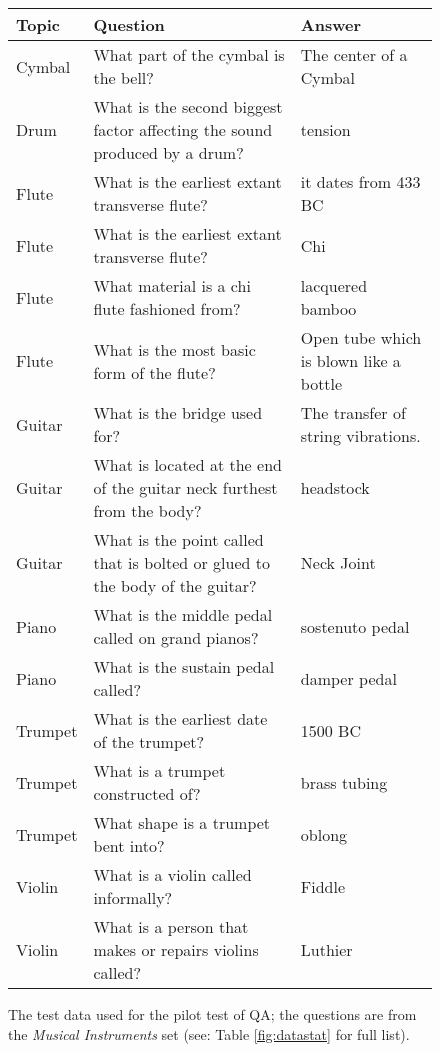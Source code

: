 \documentclass[twoside]{article}
\begin{document}
\begin{figure}
\caption{The test data used for the pilot test of  QA; the questions are from the \textit{Musical Instruments} set (see: Table \ref{fig:datastat} for full list). \label{fig:test_data}}
\begin{tabular}{|l|p{10cm}|p{2cm}|}
\hline
Topic & Question & Answer \\ \hline
Cymbal & What part of the cymbal is the bell?  & The center of a Cymbal \\ \hline
Drum & What is the second biggest factor affecting the sound produced by a drum?   & tension \\ \hline
Flute & What is the earliest extant transverse flute?  & it dates from 433 BC \\ \hline
Flute & What is the earliest extant transverse flute?  & Chi \\ \hline
Flute & What material is a chi flute fashioned from?  & lacquered bamboo \\ \hline
Flute & What is the most basic form of the flute?  & Open tube which is blown like a bottle \\ \hline
Guitar & What is the bridge used for?  & The transfer of string vibrations. \\ \hline
Guitar & What is located at the end of the guitar neck furthest from the body?  & headstock \\ \hline
Guitar & What is the point called that is bolted or glued to the body of the guitar?  & Neck Joint \\ \hline
Piano & What is the middle pedal called on grand pianos?  & sostenuto pedal \\ \hline
Piano & What is the sustain pedal called?  & damper pedal \\ \hline
Trumpet & What is the earliest date of the trumpet?  & 1500 BC \\ \hline
Trumpet & What is a trumpet constructed of?  & brass tubing \\ \hline
Trumpet & What shape is a trumpet bent into?  & oblong \\ \hline
Violin & What is a violin called informally? & Fiddle \\ \hline
Violin & What is a person that makes or repairs violins called? & Luthier \\ \hline
\end{tabular}
\end{figure}
\end{document}

